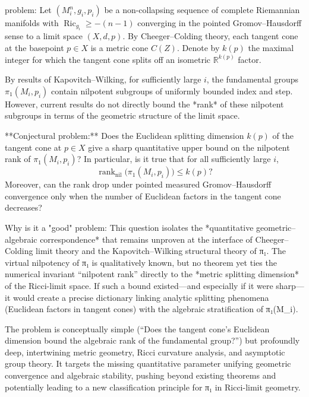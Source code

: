 problem:  
Let \((M_i^n,g_i,p_i)\) be a non-collapsing sequence of complete Riemannian manifolds with \(\operatorname{Ric}_{g_i}\geq -(n-1)\) converging in the pointed Gromov–Hausdorff sense to a limit space \((X,d,p)\). By Cheeger–Colding theory, each tangent cone at the basepoint \(p\in X\) is a metric cone \(C(Z)\). Denote by \(k(p)\) the maximal integer for which the tangent cone splits off an isometric \(\mathbb{R}^{k(p)}\) factor.

By results of Kapovitch–Wilking, for sufficiently large \(i\), the fundamental groups \(\pi_1(M_i,p_i)\) contain nilpotent subgroups of uniformly bounded index and step. However, current results do not directly bound the *rank* of these nilpotent subgroups in terms of the geometric structure of the limit space.

**Conjectural problem:**  
Does the Euclidean splitting dimension \(k(p)\) of the tangent cone at \(p\in X\) give a sharp quantitative upper bound on the nilpotent rank of \(\pi_1(M_i,p_i)\)? In particular, is it true that for all sufficiently large \(i\),
\[
\operatorname{rank}_{\mathrm{nil}}\big(\pi_1(M_i,p_i)\big) \le k(p)?
\]
Moreover, can the rank drop under pointed measured Gromov–Hausdorff convergence only when the number of Euclidean factors in the tangent cone decreases?

Why is it a "good" problem:  
This question isolates the *quantitative geometric–algebraic correspondence* that remains unproven at the interface of Cheeger–Colding limit theory and the Kapovitch–Wilking structural theory of π₁. The virtual nilpotency of π₁ is qualitatively known, but no theorem yet ties the numerical invariant “nilpotent rank” directly to the *metric splitting dimension* of the Ricci-limit space. If such a bound existed—and especially if it were sharp—it would create a precise dictionary linking analytic splitting phenomena (Euclidean factors in tangent cones) with the algebraic stratification of π₁(M_i).  

The problem is conceptually simple (“Does the tangent cone’s Euclidean dimension bound the algebraic rank of the fundamental group?”) but profoundly deep, intertwining metric geometry, Ricci curvature analysis, and asymptotic group theory. It targets the missing quantitative parameter unifying geometric convergence and algebraic stability, pushing beyond existing theorems and potentially leading to a new classification principle for π₁ in Ricci-limit geometry.